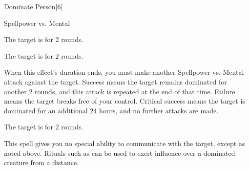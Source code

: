 \begin{spellsection}{Dominate Person}[6]
    \begin{spellheader}
    \end{spellheader}
    \begin{spellcontent}
        \begin{spelltargetinginfo}
        \end{spelltargetinginfo}
        \begin{spelleffects}
            \begin{spellattack}{Spellpower vs. Mental}

                \spellsuccess The target is \confused for 2 rounds.

                \spellcritical The target is \dominated for 2 rounds.

                When this effect's duration ends, you must make another Spellpower vs. Mental attack against the target.
                Success means the target remains dominated for another 2 rounds, and this attack is repeated at the end of that time.
                Failure means the target breaks free of your control.
                Critical success means the target is dominated for an additional 24 hours, and no further attacks are made.

                \spellfailure The target is \dazed for 2 rounds.
            \end{spellattack}
        \end{spelleffects}
    \end{spellcontent}
    \begin{spellfooter}
        \spellnotes This spell gives you no special ability to communicate with the target, except as noted above. Rituals such as  can be used to exert influence over a dominated creature from a distance.
        \miscastrandom
    \end{spellfooter}
    \begin{spellaugments}
    \end{spellaugments}
\end{spellsection}

